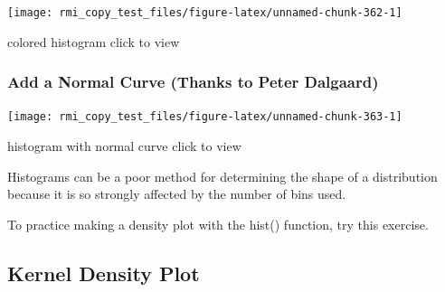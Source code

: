 \documentclass[]{book}
\newenvironment{Shaded}{\begin{snugshade}}{\end{snugshade}}
\newcommand{\KeywordTok}[1]{\textcolor[rgb]{0.13,0.29,0.53}{\textbf{#1}}}
\newcommand{\DataTypeTok}[1]{\textcolor[rgb]{0.13,0.29,0.53}{#1}}
\newcommand{\DecValTok}[1]{\textcolor[rgb]{0.00,0.00,0.81}{#1}}
\newcommand{\StringTok}[1]{\textcolor[rgb]{0.31,0.60,0.02}{#1}}
\newcommand{\OperatorTok}[1]{\textcolor[rgb]{0.81,0.36,0.00}{\textbf{#1}}}
\newcommand{\NormalTok}[1]{#1}
\theoremstyle{definition}
\theoremstyle{definition}
\theoremstyle{definition}
\theoremstyle{remark}
\begin{document}
\begin{center}\texttt{[image: rmi\_copy\_test\_files/figure-latex/unnamed-chunk-362-1]} \end{center}

colored histogram click to view

\subsubsection{Add a Normal Curve (Thanks to Peter
Dalgaard)}\label{add-a-normal-curve-thanks-to-peter-dalgaard}

\begin{Shaded}
\end{Shaded}

\begin{center}\texttt{[image: rmi\_copy\_test\_files/figure-latex/unnamed-chunk-363-1]} \end{center}

histogram with normal curve click to view

Histograms can be a poor method for determining the shape of a
distribution because it is so strongly affected by the number of bins
used.

To practice making a density plot with the hist() function, try this
exercise.

\subsection{Kernel Density Plot}\label{kernel-density-plot}
\end{document}
